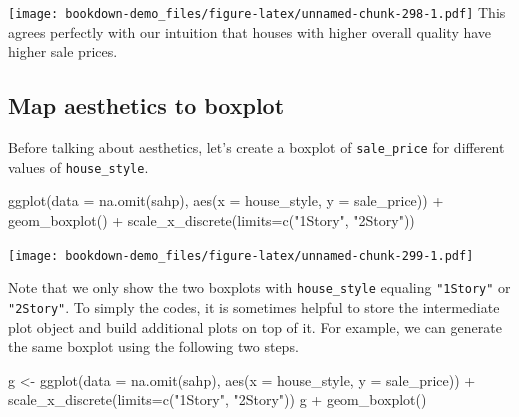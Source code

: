 \documentclass[
]{book}
\newenvironment{Shaded}{\begin{snugshade}}{\end{snugshade}}
\newcommand{\AttributeTok}[1]{\textcolor[rgb]{0.77,0.63,0.00}{#1}}
\newcommand{\FunctionTok}[1]{\textcolor[rgb]{0.00,0.00,0.00}{#1}}
\newcommand{\NormalTok}[1]{#1}
\newcommand{\OtherTok}[1]{\textcolor[rgb]{0.56,0.35,0.01}{#1}}
\newcommand{\SpecialCharTok}[1]{\textcolor[rgb]{0.00,0.00,0.00}{#1}}
\newcommand{\StringTok}[1]{\textcolor[rgb]{0.31,0.60,0.02}{#1}}
\begin{document}
\texttt{[image: bookdown-demo\_files/figure-latex/unnamed-chunk-298-1.pdf]}
This agrees perfectly with our intuition that houses with higher overall quality have higher sale prices.

\hypertarget{map-aesthetics-to-boxplot}{%
\subsection{Map aesthetics to boxplot}\label{map-aesthetics-to-boxplot}}

Before talking about aesthetics, let's create a boxplot of \texttt{sale\_price} for different values of \texttt{house\_style}.

\begin{Shaded}
\begin{Highlighting}[]
\FunctionTok{ggplot}\NormalTok{(}\AttributeTok{data =} \FunctionTok{na.omit}\NormalTok{(sahp), }\FunctionTok{aes}\NormalTok{(}\AttributeTok{x =}\NormalTok{ house\_style, }\AttributeTok{y =}\NormalTok{ sale\_price)) }\SpecialCharTok{+} \FunctionTok{geom\_boxplot}\NormalTok{() }\SpecialCharTok{+} \FunctionTok{scale\_x\_discrete}\NormalTok{(}\AttributeTok{limits=}\FunctionTok{c}\NormalTok{(}\StringTok{"1Story"}\NormalTok{, }\StringTok{"2Story"}\NormalTok{))}
\end{Highlighting}
\end{Shaded}

\texttt{[image: bookdown-demo\_files/figure-latex/unnamed-chunk-299-1.pdf]}

Note that we only show the two boxplots with \texttt{house\_style} equaling \texttt{"1Story"} or \texttt{"2Story"}. To simply the codes, it is sometimes helpful to store the intermediate plot object and build additional plots on top of it. For example, we can generate the same boxplot using the following two steps.

\begin{Shaded}
\begin{Highlighting}[]
\NormalTok{g }\OtherTok{\textless{}{-}} \FunctionTok{ggplot}\NormalTok{(}\AttributeTok{data =} \FunctionTok{na.omit}\NormalTok{(sahp), }\FunctionTok{aes}\NormalTok{(}\AttributeTok{x =}\NormalTok{ house\_style, }\AttributeTok{y =}\NormalTok{ sale\_price)) }\SpecialCharTok{+} \FunctionTok{scale\_x\_discrete}\NormalTok{(}\AttributeTok{limits=}\FunctionTok{c}\NormalTok{(}\StringTok{"1Story"}\NormalTok{, }\StringTok{"2Story"}\NormalTok{))}
\NormalTok{g }\SpecialCharTok{+} \FunctionTok{geom\_boxplot}\NormalTok{()}
\end{Highlighting}
\end{Shaded}
\end{document}
